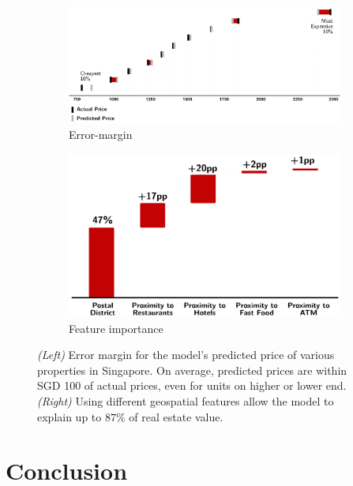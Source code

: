 \documentclass{article}
\begin{document}
\begin{figure}[t]
    \begin{subfigure}{0.49\textwidth}
        \centering
        \includegraphics[width=\linewidth]{errors.pdf}
        \caption{Error-margin}
        \label{usecase:error}
    \end{subfigure}
    \begin{subfigure}{0.49\textwidth}
        \centering
        \includegraphics[width=\linewidth]{feature_importance.pdf}
        \caption{Feature importance}
        \label{usecase:feature}
    \end{subfigure}
    \caption{
        \textit{(Left)} Error margin for the model's predicted price of various
        properties in Singapore. On average, predicted prices are within SGD
        100 of actual prices, even for units on higher or lower end.
        \textit{(Right)} Using different geospatial features allow the model to
        explain up to $87\%$ of real estate value.
    }
\end{figure}

\section{Conclusion}
\end{document}
